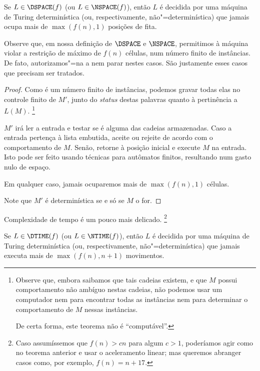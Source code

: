 \begin{theorem}
    Se $L \in \DSPACE(f)$ (ou $L \in \NSPACE(f)$),
    então $L$ é decidida por uma máquina de Turing
    determinística (ou, respectivamente, não"=determinística)
    que jamais ocupa mais de $\max(f(n), 1)$
    posições de fita.
\end{theorem}

Observe que, em nossa definição de $\DSPACE$ e $\NSPACE$,
permitimos à máquina violar a restrição de
máximo de $f(n)$ células,
num número finito de instâncias.
De fato,
autorizamos"=na a nem parar nestes casos.
São justamente esses casos que precisam ser tratados.

\begin{proof}
    Como é um número finito de instâncias,
    podemos gravar todas elas no controle finito de $M'$,
    junto do \emph{status} destas palavras
    quanto à pertinência a $L(M)$.
    \footnote{
        Observe que,
        embora saibamos que tais cadeias existem,
        e que $M$ possui comportamento não ambíguo
        nestas cadeias,
        não podemos usar um computador
        nem para encontrar todas as instâncias
        nem para determinar o comportamento de $M$ nessas instâncias.

        De certa forma,
        este teorema não é ``computável''.
    }

    $M'$ irá ler a entrada
    e testar se é alguma das cadeias armazenadas.
    Caso a entrada pertença à lista embutida,
    aceite ou rejeite de acordo com o comportamento de $M$.
    Senão, retorne à posição inicial
    e execute $M$ na entrada.
    Isto pode ser feito usando técnicas
    para autômatos finitos,
    resultando num gasto nulo de espaço.

    Em qualquer caso,
    jamais ocuparemos mais de $\max(f(n), 1)$ células.

    Note que $M'$ é determinística
    se e só se $M$ o for.
\end{proof}

Complexidade de tempo é um pouco mais delicado.
\footnote{
    Caso assumíssemos que $f(n) > cn$
    para algum $c > 1$,
    poderíamos agir como no teorema anterior
    e usar o aceleramento linear;
    mas queremos abranger casos
    como, por exemplo,
    $f(n) = n + 17$.
}

\begin{theorem}
    Se $L \in \DTIME(f)$ (ou $L \in \NTIME(f)$),
    então $L$ é decidida por uma máquina de Turing
    determinística (ou, respectivamente, não"=determinística)
    que jamais executa mais de $\max(f(n), n+1)$ movimentos.
\end{theorem}

